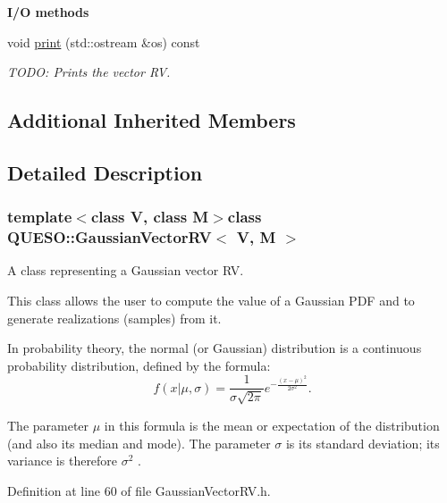 \begin{Indent}{\bf I/\-O methods}\par
\begin{DoxyCompactItemize}
\item 
void \hyperlink{class_q_u_e_s_o_1_1_gaussian_vector_r_v_a2c7bee2104f7e257ca31d185634c2910}{print} (std\-::ostream \&os) const 
\begin{DoxyCompactList}\small\item\em T\-O\-D\-O\-: Prints the vector R\-V. \end{DoxyCompactList}\end{DoxyCompactItemize}
\end{Indent}
\subsection*{Additional Inherited Members}


\subsection{Detailed Description}
\subsubsection*{template$<$class V, class M$>$class Q\-U\-E\-S\-O\-::\-Gaussian\-Vector\-R\-V$<$ V, M $>$}

A class representing a Gaussian vector R\-V. 

This class allows the user to compute the value of a Gaussian P\-D\-F and to generate realizations (samples) from it.

In probability theory, the normal (or Gaussian) distribution is a continuous probability distribution, defined by the formula\-: \[ f(x| \mu,\sigma) = \frac{1}{\sigma\sqrt{2\pi}} e^{ -\frac{(x-\mu)^2}{2\sigma^2} }. \]

The parameter $ \mu $ in this formula is the mean or expectation of the distribution (and also its median and mode). The parameter $ \sigma $ is its standard deviation; its variance is therefore $ \sigma^2 $ . 

Definition at line 60 of file Gaussian\-Vector\-R\-V.\-h.



